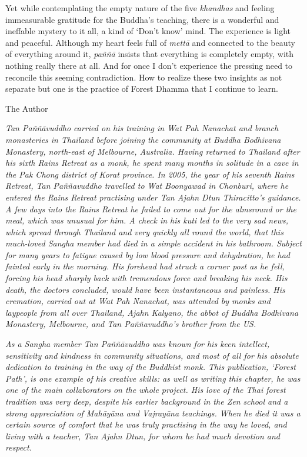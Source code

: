 Yet while contemplating the empty nature of the five \emph{khandhas} and
feeling immeasurable gratitude for the Buddha's teaching, there is a
wonderful and ineffable mystery to it all, a kind of `Don't know' mind.
The experience is light and peaceful. Although my heart feels full of
\emph{mettā} and connected to the beauty of everything around it,
\emph{paññā} insists that everything is completely empty, with nothing
really there at all. And for once I don't experience the pressing need
to reconcile this seeming contradiction. How to realize these two
insights as not separate but one is the practice of Forest Dhamma that I
continue to learn.

The Author

\emph{Tan Paññāvuddho carried on his training in Wat Pah Nanachat and
branch monasteries in Thailand before joining the community at Buddha
Bodhivana Monastery, north-east of Melbourne, Australia. Having returned
to Thailand after his sixth Rains Retreat as a monk, he spent many
months in solitude in a cave in the Pak Chong district of Korat
province. In 2005, the year of his seventh Rains Retreat, Tan
Paññavuddho travelled to Wat Boonyawad in Chonburi, where he entered the
Rains Retreat practising under Tan Ajahn Dtun Thiracitto's guidance. A
few days into the Rains Retreat he failed to come out for the almsround
or the meal, which was unusual for him. A check in his kuti led to the
very sad news, which spread through Thailand and very quickly all round
the world, that this much-loved Sangha member had died in a simple
accident in his bathroom. Subject for many years to fatigue caused by
low blood pressure and dehydration, he had fainted early in the morning.
His forehead had struck a corner post as he fell, forcing his head
sharply back with tremendous force and breaking his neck. His death, the
doctors concluded, would have been instantaneous and painless. His
cremation, carried out at Wat Pah Nanachat, was attended by monks and
laypeople from all over Thailand, Ajahn Kalyano, the abbot of Buddha
Bodhivana Monastery, Melbourne, and Tan Paññavuddho's brother from the
US.}

\emph{As a Sangha member Tan Paññāvuddho was known for his keen
intellect, sensitivity and kindness in community situations, and most of
all for his absolute dedication to training in the way of the Buddhist
monk. This publication, `Forest Path', is one example of his creative
skills: as well as writing this chapter, he was one of the main
collaborators on the whole project. His love of the Thai forest
tradition was very deep, despite his earlier background in the Zen
school and a strong appreciation of Mahāyāna and Vajrayāna teachings.
When he died it was a certain source of comfort that he was truly
practising in the way he loved, and living with a teacher, Tan Ajahn
Dtun, for whom he had much devotion and respect.}

